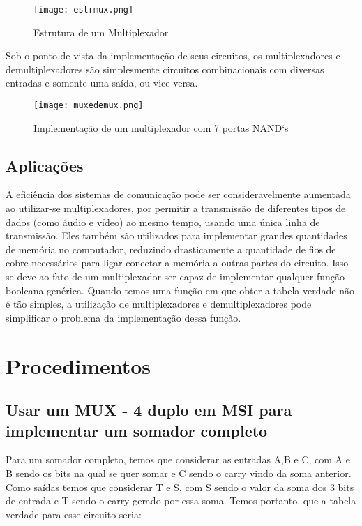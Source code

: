 \documentclass[12pt]{article}
\begin{document}
\begin{figure}[H]
	\centering
	\texttt{[image: estrmux.png]}
	\caption{Estrutura de um Multiplexador}
	\label{fig:estmux}
\end{figure}

Sob o ponto de vista da implementação de seus circuitos, os multiplexadores e demultiplexadores são simplesmente circuitos combinacionais com diversas entradas e somente uma saída, ou vice-versa.

\begin{figure}[H]
	\centering
	\texttt{[image: muxedemux.png]}
	\caption{Implementação de um multiplexador com 7 portas NAND`s}
	\label{fig:muxedemux}
\end{figure}

\subsection{Aplicações}
	A eficiência dos sistemas de comunicação pode ser consideravelmente aumentada ao utilizar-se multiplexadores, por permitir a transmissão de diferentes tipos de dados (como áudio e vídeo) ao mesmo tempo, usando uma única linha de transmissão. Eles também são utilizados para implementar grandes quantidades de memória no computador, reduzindo drasticamente a quantidade de fios de cobre necessários para ligar conectar a memória a outras partes do circuito. Isso se deve ao fato de um multiplexador ser capaz de implementar qualquer função booleana genérica. Quando temos uma função em que obter a tabela verdade não é tão simples, a utilização de multiplexadores e demultiplexadores pode simplificar o problema da implementação dessa função.
	
\section{Procedimentos}
\label{sec:Procedimentos}

\subsection{Usar um MUX - 4 duplo em MSI para implementar um somador completo}
\label{sec:Mux}

Para um somador completo, temos que considerar as entradas A,B e C, com A e B sendo os bits na qual se quer somar e C sendo o carry vindo da soma anterior. Como saídas temos que considerar T e S, com S sendo o valor da soma dos 3 bits de entrada e T sendo o carry gerado por essa soma.	Temos portanto, que a tabela verdade para esse circuito seria:
\end{document}
